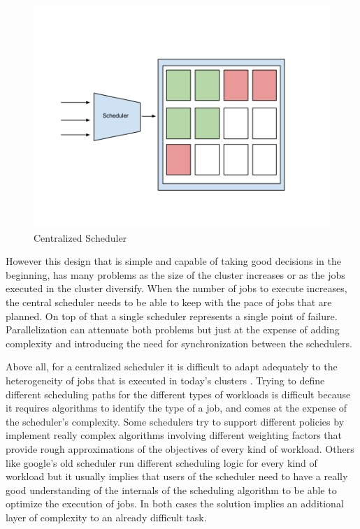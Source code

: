 \documentclass{report}                     %
\begin{document}
\begin{figure}[!ht]
  \centering
  \includegraphics[scale=0.25,natwidth=960,natheight=720]{CentralizedScheduler.png}
  \caption{Centralized Scheduler}
  \label{fig:centralized}
\end{figure}

However this design that is simple and capable of taking good
decisions in the beginning, has many problems as the size of the
cluster increases or as the jobs executed in the cluster
diversify. When the number of jobs to execute increases, the central
scheduler needs to be able to keep with the pace of jobs that are
planned. On top of that a single scheduler represents a single point
of failure. Parallelization can attenuate both problems but just at the
expense of adding complexity and introducing the need for synchronization
between the schedulers.

Above all, for a centralized scheduler it is difficult to adapt
adequately to the heterogeneity of jobs that is executed in today's
clusters \cite{37201}. Trying to define different scheduling paths for
the different types of workloads is difficult because it requires
algorithms to identify the type of a job, and comes at the expense of
the scheduler's complexity. Some schedulers try to support different
policies by implement really complex algorithms involving different
weighting factors that provide rough approximations of the objectives
of every kind of workload. Others like google's old scheduler run
different scheduling logic for every kind of workload but it usually
implies that users of the scheduler need to have a really good
understanding of the internals of the scheduling algorithm to be able
to optimize the execution of jobs. In both cases the solution implies
an additional layer of complexity to an already difficult task.
\end{document}

